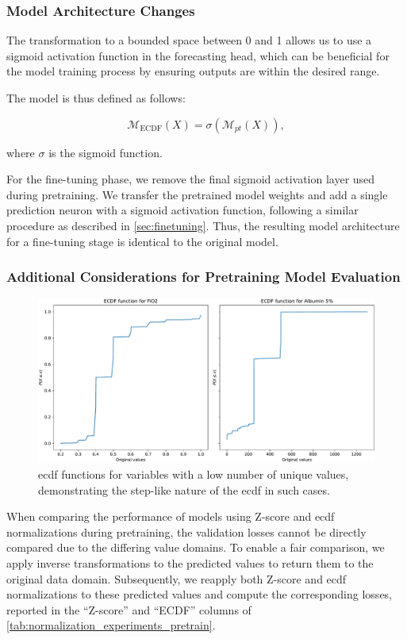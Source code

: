 \subsubsection*{Model Architecture Changes}

The transformation to a bounded space between 0 and 1 allows us to use a sigmoid activation function in the forecasting head, which can be beneficial for the model training process by ensuring outputs are within the desired range.

The model is thus defined as follows:

\[
\mathcal{M}_{\text{ECDF}}(X) = \sigma(\mathcal{M}_{pt}(X)),
\]

where \(\sigma\) is the sigmoid function.

For the fine-tuning phase, we remove the final sigmoid activation layer used during pretraining. We transfer the pretrained model weights and add a single prediction neuron with a sigmoid activation function, following a similar procedure as described in \cref{sec:finetuning}. Thus, the resulting model architecture for a fine-tuning stage is identical to the original model.

\subsubsection*{Additional Considerations for Pretraining Model Evaluation}


\begin{figure}[h!]
    \centering
    \includegraphics[width=\textwidth]{figures/ecdfs}
    \caption{\gls{ecdf} functions for variables with a low number of unique values, demonstrating the step-like nature of the \gls{ecdf} in such cases.}
    \label{fig:ecdf_pathological}
\end{figure}

When comparing the performance of models using Z-score and \gls{ecdf} normalizations during pretraining, the validation losses cannot be directly compared due to the differing value domains. To enable a fair comparison, we apply inverse transformations to the predicted values to return them to the original data domain. Subsequently, we reapply both Z-score and \gls{ecdf} normalizations to these predicted values and compute the corresponding losses, reported in the ``Z-score'' and ``ECDF'' columns of \cref{tab:normalization_experiments_pretrain}.

